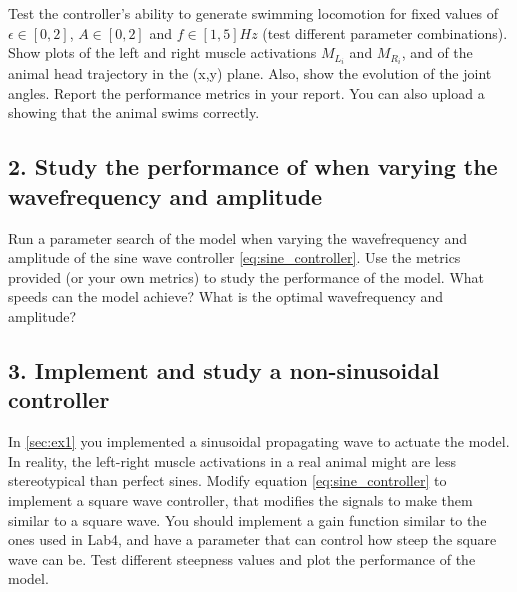 \documentclass{cmc}
\begin{document}
Test the controller's ability to generate swimming locomotion for fixed values of $\epsilon \in [0,2]$, $A \in [0,2]$ and $f \in [1,5] Hz$ (test different parameter combinations). Show plots of the left and right muscle activations $M_{L_i}$ and $M_{R_i}$, and of the animal head trajectory in the (x,y) plane. Also, show the evolution of the joint angles. Report the performance metrics in your report. You can also upload a showing that the animal swims correctly.



\subsection*{2. Study the performance of when varying the wavefrequency and amplitude}\label{sec:ex1}
Run a parameter search of the model when varying the wavefrequency and amplitude of the sine wave controller \ref{eq:sine_controller}. Use the metrics provided (or your own metrics) to study the performance of the model. What speeds can the model achieve? What is the optimal wavefrequency and amplitude?



\subsection*{3. Implement and study a non-sinusoidal controller}\label{sec:ex2}
In \ref{sec:ex1} you implemented a sinusoidal propagating wave to actuate the model. In reality, the left-right muscle activations in a real animal might are less stereotypical than perfect sines. Modify equation \ref{eq:sine_controller} to implement a square wave controller, that modifies the signals to make them similar to a square wave. You should implement a gain function similar to the ones used in Lab4, and have a parameter that can control how steep the square wave can be. Test different steepness values and plot the performance of the model.




\end{document}
